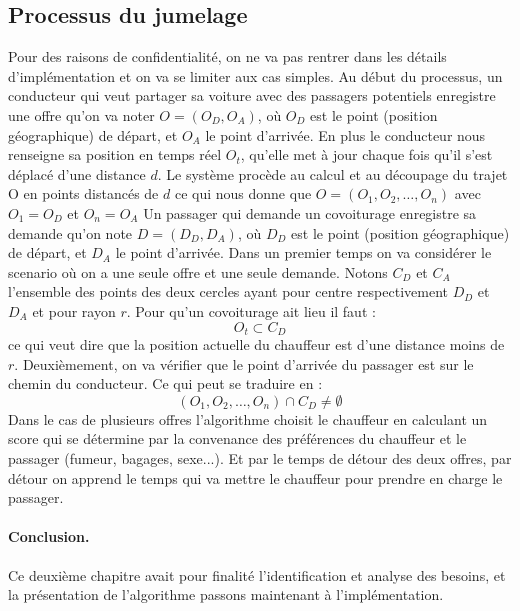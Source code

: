 \subsection{Processus du jumelage} %
Pour des raisons de confidentialité, on ne va pas rentrer dans les détails d'implémentation et on va se limiter aux cas simples.\cite{schreieck2016matching}\newline
Au début du processus, un conducteur qui veut partager sa voiture avec des passagers potentiels enregistre 
une offre qu'on va noter $O = (O_D, O_A)$, où $O_D$ est le point (position géographique) de départ, et $O_A$
le point d'arrivée. En plus le conducteur nous renseigne sa position en temps réel $O_t$, qu'elle met à jour chaque fois qu'il s'est déplacé d'une distance $d$. Le système procède au calcul et au découpage du trajet O en points distancés de $d$ ce qui nous donne que $O = (O_{1}, O_{2},\ldots , O_{n})$ avec $O_{1} = O_D$ et $O_{n} = O_A$\newline
Un passager qui demande un covoiturage enregistre sa demande qu'on note $D = (D_D, D_A)$, où $D_D$ est le point (position géographique) de départ, et $D_A$ le point d'arrivée.\newline
Dans un premier temps on va considérer le scenario où on a une seule offre et une seule demande. Notons $C_D$ et $C_A$ l'ensemble des points des deux cercles ayant pour centre respectivement $D_D$ et $D_A$ et pour rayon $r$.
Pour qu'un covoiturage ait lieu il faut : 
\begin{equation}
O_t \subset C_D 
\label{eqution1}
\end{equation}
ce qui veut dire que la position actuelle du chauffeur est d'une distance moins de $r$.
Deuxièmement, on va vérifier que le point d'arrivée du passager est sur le chemin du conducteur. Ce qui peut se traduire en :
\begin{equation}
(O_{1}, O_{2},\ldots , O_{n}) \cap C_D \ne \emptyset
\label{eqution2}
\end{equation}
Dans le cas de plusieurs offres l'algorithme choisit le chauffeur en calculant un score qui se détermine par la convenance des préférences du chauffeur et le passager (fumeur, bagages, sexe...). Et par le temps de détour des deux offres, par détour on apprend le temps qui va mettre le chauffeur pour prendre en charge le passager.
\newline
\paragraph{Conclusion.} Ce deuxième chapitre avait pour finalité l'identification et analyse des besoins, et la présentation de l'algorithme passons maintenant à l'implémentation.